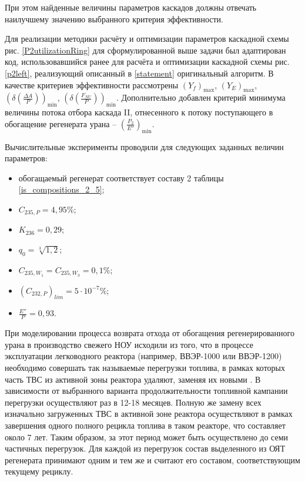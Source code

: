 При этом найденные величины параметров каскадов должны отвечать наилучшему значению выбранного критерия эффективности.  

Для реализации методики расчёту и оптимизации параметров каскадной схемы рис. \ref{P2utilizationRing} для сформулированной выше задачи был адаптирован код, использовавшийся ранее для расчёта и оптимизации каскадной схемы рис. \ref{p2left}, реализующий описанный в \ref{statement} оригинальный алгоритм. В качестве критериев эффективности рассмотрены $(Y_f)_\text{max}$, $(Y_{E})_\text{max}$, $(\delta(\frac{\Delta A}{P}))_\text{min}$, $(\delta(\frac{F_{NU}}{P}))_\text{min}$. Дополнительно добавлен критерий минимума величины потока отбора каскада II, отнесенного к потоку поступающего в обогащение регенерата урана -- $(\frac{P_2}{E''})_\text{min}$.     

Вычислительные эксперименты проводили для следующих заданных величин параметров: 

\begin{itemize}
    \item обогащаемый регенерат соответствует составу 2 таблицы \ref{is_compositions_2_5};
    \item $C_{235,{P}}=4,95\%$;
    \item $K_{236}=0,29$;
    \item $q_{0} = \sqrt[3]{1,2}$;
    \item $C_{235,{W_1}}=C_{235,{W_3}}=0,1\%$;
    \item ${(C_{232,P})}_{lim}=5\cdot10^{-7}\%$;
    \item $\frac{E''}{P}=0,93$.
\end{itemize}

При моделировании процесса возврата отхода от обогащения регенерированного урана в производство свежего НОУ исходили из того, что в процессе эксплуатации легководного реактора (например, ВВЭР-1000 или ВВЭР-1200) необходимо совершать так называемые перегрузки топлива, в рамках которых часть ТВС из активной зоны реактора удаляют, заменяя их новыми \cite{острейковскийEkspluataciyaAtomnyhStanciy1999}. В зависимости от выбранного варианта продолжительности топливной кампании перегрузки осуществляют раз в 12-18 месяцев. Полную же замену всех изначально загруженных ТВС в активной зоне реактора осуществляют в рамках завершения одного полного рецикла топлива в таком реакторе, что составляет около 7 лет. Таким образом, за этот период может быть осуществлено до семи частичных перегрузок. Для каждой из перегрузок состав выделенного из ОЯТ регенерата принимают одним и тем же и считают его составом, соответствующим текущему рециклу.

